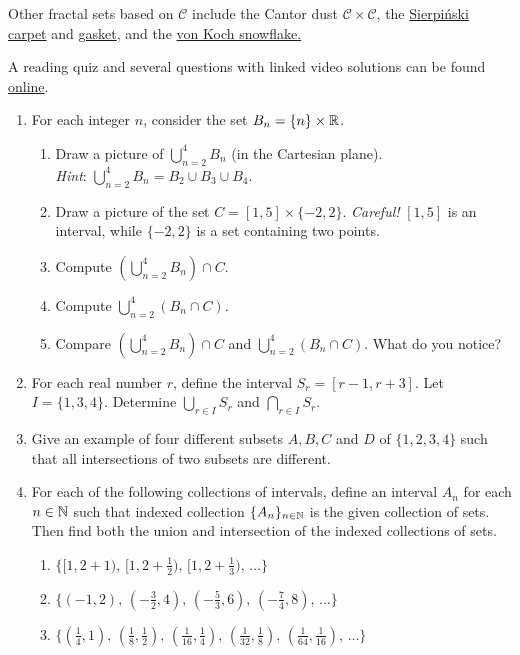 Other fractal sets based on $\mathcal C$ include the Cantor dust $\mathcal C\times\mathcal C$, the \href{http://en.wikipedia.org/wiki/Sierpinski_carpet}{Sierpi\'nski carpet} and \href{http://en.wikipedia.org/wiki/Sierpinski_triangle}{gasket}, and the \href{http://en.wikipedia.org/wiki/Koch_snowflake}{von Koch snowflake.}




\begin{exercises}{}{}
A reading quiz and several questions with linked video solutions can be found \href{http://www.math.uci.edu/~ndonalds/math13/selftest/6-3-indexed.html}{online}.

\begin{enumerate}
  	\item For each integer $n$, consider the set $B_n=\{n\}\times\mathbb{R}$.
	\begin{enumerate}
		\item Draw a picture of $\bigcup\limits_{n=2}^4B_n$ (in the Cartesian plane).\\
		\emph{Hint}:  $\bigcup \limits_{n=2}^{4} B_n= B_2 \cup B_3 \cup B_4.$
		\item Draw a picture of the set $C=[1,5]\times\{-2,2\}.$
		\emph{Careful!} $[1,5]$ is an interval, while $\{-2,2\}$ is a set containing two points.
		\item Compute $\left(\bigcup\limits_{n=2}^4B_n\right)\cap C$.
		\item Compute $\bigcup\limits_{n=2}^4\left(B_n\cap C\right)$.
		\item Compare $\left(\bigcup\limits_{n=2}^4B_n\right)\cap C$ and $\bigcup\limits_{n=2}^4\left(B_n\cap C\right)$. What do you notice?
	\end{enumerate}

  \item For each real number $r$, define the interval $S_r=[r-1,r+3]$. Let $I=\{1,3,4\}$. Determine $\bigcup\limits_{r\in I}S_r$ and $\bigcap\limits_{r\in I}S_r$.


  \item Give an example of four different subsets $A,B,C$ and $D$ of $\{1,2,3,4\}$ such that all intersections of two subsets are different.

  \item For each of the following collections of intervals, define an interval $A_n$ for each $n\in\mathbb{N}$ such that indexed collection $\{A_n\}_{n\in\mathbb{N}}$ is the given collection of sets. Then find both the union and intersection of the indexed collections of sets.
   \begin{enumerate}
     \item $\big\{[1,2+1),\,[1,2+\frac 12),\,[1,2+\frac 13),\,\ldots\big\}$
     \item $\big\{(-1,2),\,(-\frac 32,4),\,(-\frac 53,6),\,(-\frac 74,8),\,\ldots\big\}$
     \item $\big\{(\frac 14,1),\,(\frac 18,\frac 12),\,(\frac 1{16},\frac 14),\,(\frac 1{32},\frac 18), \,(\frac 1{64},\frac 1{16}),\,\ldots\big\}$
   \end{enumerate}
  

\end{enumerate}
\end{exercises}
